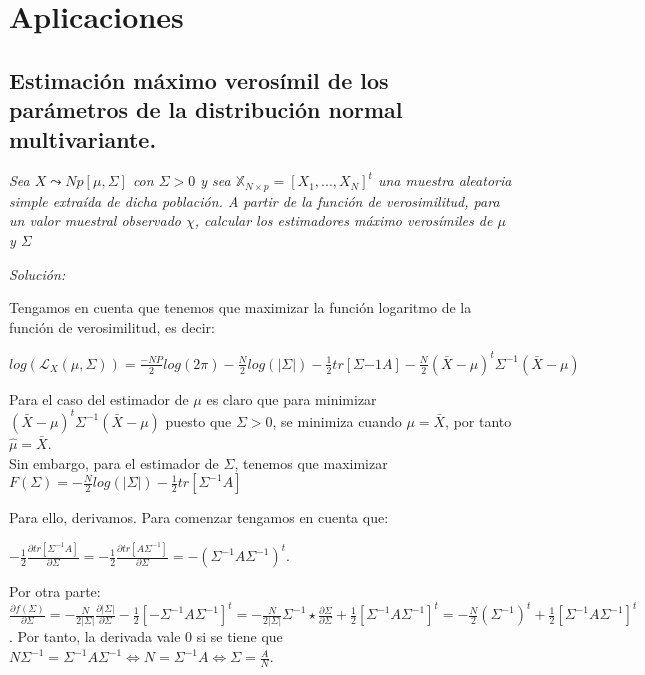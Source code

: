 \documentclass{article}
\theoremstyle{theorem-style}  %
\theoremstyle{definition-style}
\theoremstyle{example-style}
\theoremstyle{exercise-style}
\begin{document}
	\section{Aplicaciones}
	
	\subsection{Estimación máximo verosímil de los parámetros de la distribución normal multivariante.}
	
	\textit{Sea $X \leadsto Np[\mu, \Sigma]$ con $\Sigma > 0$ y sea $\mathbb{X}_{N \times p} = [X_1, ..., X_N]^t$ una muestra aleatoria simple extraída de dicha población. A partir de la función de verosimilitud, para un valor muestral observado $\chi$, calcular los estimadores máximo verosímiles de $\mu$ y $\Sigma$}
	
	\textit{Solución: }
	
	Tengamos en cuenta que tenemos que maximizar la función logaritmo de la función de verosimilitud, es decir:
	
	$log(\mathcal{L}_X(\mu, \Sigma))=\frac{-NP}{2}log(2\pi)- \frac{N}{2}log(|\Sigma|) - \frac{1}{2}tr[\Sigma{-1}A] - \frac{N}{2}(\bar{X}-\mu)^t\Sigma^{-1}(\bar{X}-\mu)$
	
	Para el caso del estimador de $\mu$ es claro que para minimizar $(\bar{X}-\mu)^t\Sigma^{-1}(\bar{X}-\mu)$ puesto que $\Sigma>0$, se minimiza cuando $\mu = \bar{X}$, por tanto $ \hat{\mu} = \bar{X}$.\\
	
	Sin embargo, para el estimador de $\Sigma$, tenemos que maximizar $F(\Sigma) = -\frac{N}{2}log(|\Sigma|) - \frac{1}{2}tr[\Sigma^{-1}A]$
	
	Para ello, derivamos. Para comenzar tengamos en cuenta que:
	
	$-\frac{1}{2}\frac{\partial tr[\Sigma^{-1}A]}{\partial \Sigma}=-\frac{1}{2}\frac{\partial tr[A\Sigma^{-1}]}{\partial \Sigma}  = -(\Sigma^{-1}A\Sigma^{-1})^t.$
	
	Por otra parte: $\frac{\partial f(\Sigma)}{\partial \Sigma} = -\frac{N}{2|\Sigma|} \frac{\partial |\Sigma|}{\partial \Sigma} - \frac{1}{2}[- \Sigma^{-1}A\Sigma^{-1}]^t =  -\frac{N}{2|\Sigma|} \Sigma^{-1} \star \frac{\partial \Sigma}{\partial \Sigma} + \frac{1}{2}[\Sigma^{-1}A\Sigma^{-1}]^t = -\frac{N}{2}(\Sigma^{-1})^t + \frac{1}{2}[\Sigma^{-1}A\Sigma^{-1}]^t$. Por tanto, la derivada vale 0 si se tiene que $N\Sigma^{-1} = \Sigma^{-1}A\Sigma^{-1} \iff N = \Sigma^{-1}A \iff \Sigma = \frac{A}{N}$.
	
\end{document}
